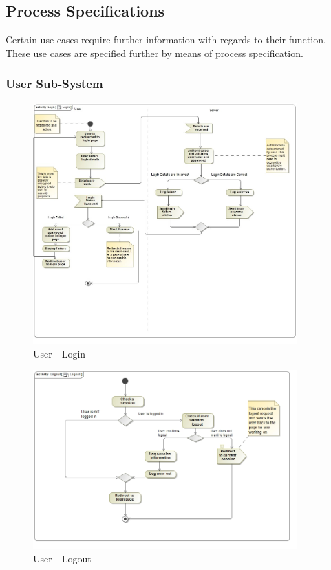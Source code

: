 \documentclass{article}
\begin{document}
		\subsection{Process Specifications}\label{subsec:processspecification}
		Certain use cases require further information with regards to their function.\\ These use cases are specified further by means of process specification.
		\subsubsection{User Sub-System}
			\begin{figure}[H]
				\includegraphics[width=4in, center]{../Diagrams/Process Specifications/Login.jpg}
				\caption{User - Login}
			\end{figure}
			\begin{figure}[H]
				\includegraphics[width=4in, center]{../Diagrams/Process Specifications/act__Logout__Logout.jpg}
				\caption{User - Logout}
			\end{figure}
\end{document}
